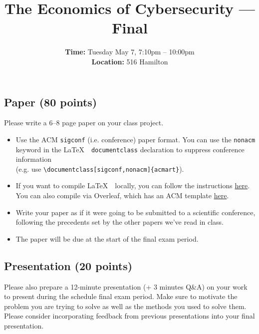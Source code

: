 \documentclass[11pt]{article}
\title{The Economics of Cybersecurity --- Final}
\date{{\bf Time:} Tuesday May 7, 7:10pm -- 10:00pm \\ {\bf Location:} 516 Hamilton}
\begin{document}
\maketitle



\subsection*{Paper (80 points)}

Please write a 6--8 page paper on your class project. 
\begin{itemize}
    \item Use the ACM \texttt{sigconf} (i.e. conference) paper format. You can use the \texttt{nonacm} keyword in the \LaTeX \ \ \texttt{documentclass} declaration to suppress conference information \\ (e.g. use \texttt{\textbackslash documentclass[sigconf,nonacm]\{acmart\}}).
    \item If you want to compile \LaTeX \ \  locally, you can follow the instructions \href{https://www.acm.org/publications/proceedings-template}{here}. You can also compile via Overleaf, which has an ACM template \href{https://www.overleaf.com/latex/templates/association-for-computing-machinery-acm-sig-proceedings-template/bmvfhcdnxfty}{here}.
    \item Write your paper as if it were going to be submitted to a scientific conference, following the precedents set by the other papers we've read in class. 
    \item The paper will be due at the start of the final exam period. 
\end{itemize}

\subsection*{Presentation (20 points)}

Please also prepare a 12-minute presentation (+ 3 minutes Q\&A) on your work to present during the schedule final exam period. Make sure to motivate the problem you are trying to solve as well as the methods you used to solve them. Please consider incorporating feedback from previous presentations into your final presentation.

\end{document}
